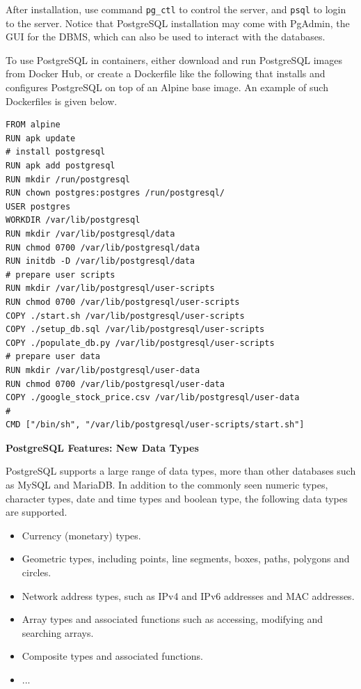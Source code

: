 After installation, use command \verb|pg_ctl| to control the server, and \verb|psql| to login to the server. Notice that PostgreSQL installation may come with PgAdmin, the GUI for the DBMS, which can also be used to interact with the databases.

To use PostgreSQL in containers, either download and run PostgreSQL images from Docker Hub, or create a Dockerfile like the following that installs and configures PostgreSQL on top of an Alpine base image. An example of such Dockerfiles is given below.
\begin{lstlisting}
FROM alpine
RUN apk update
# install postgresql
RUN apk add postgresql
RUN mkdir /run/postgresql
RUN chown postgres:postgres /run/postgresql/
USER postgres
WORKDIR /var/lib/postgresql
RUN mkdir /var/lib/postgresql/data
RUN chmod 0700 /var/lib/postgresql/data
RUN initdb -D /var/lib/postgresql/data
# prepare user scripts
RUN mkdir /var/lib/postgresql/user-scripts
RUN chmod 0700 /var/lib/postgresql/user-scripts
COPY ./start.sh /var/lib/postgresql/user-scripts
COPY ./setup_db.sql /var/lib/postgresql/user-scripts
COPY ./populate_db.py /var/lib/postgresql/user-scripts
# prepare user data
RUN mkdir /var/lib/postgresql/user-data
RUN chmod 0700 /var/lib/postgresql/user-data
COPY ./google_stock_price.csv /var/lib/postgresql/user-data
#
CMD ["/bin/sh", "/var/lib/postgresql/user-scripts/start.sh"]
\end{lstlisting}


\vspace{0.1in}
\noindent \textbf{PostgreSQL Features: New Data Types}
\vspace{0.1in}

PostgreSQL supports a large range of data types, more than other databases such as MySQL and MariaDB. In addition to the commonly seen numeric types, character types, date and time types and boolean type, the following data types are supported.
\begin{itemize}
	\item Currency (monetary) types.
	\item Geometric types, including points, line segments, boxes, paths, polygons and circles.
	\item Network address types, such as IPv4 and IPv6 addresses and MAC addresses.
	\item Array types and associated functions such as accessing, modifying and searching arrays.
	\item Composite types and associated functions.
	\item ...
\end{itemize}

